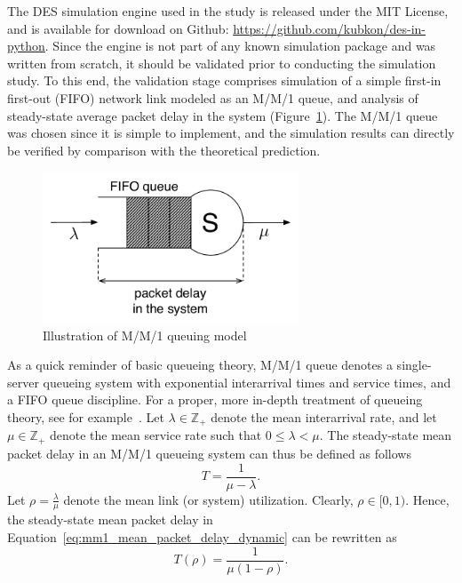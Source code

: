 The DES simulation engine used in the study is released under the MIT License, and is available for download on Github: \url{https://github.com/kubkon/des-in-python}. Since the engine is not part of any known simulation package and was written from scratch, it should be validated prior to conducting the simulation study. To this end, the validation stage comprises simulation of a simple first-in first-out (FIFO) network link modeled as an M/M/1 queue, and analysis of steady-state average packet delay in the system (Figure~\ref{fig:mm1_queue_dynamic}). The M/M/1 queue was chosen since it is simple to implement, and the simulation results can directly be verified by comparison with the theoretical prediction.

\begin{figure}[h]
	\includegraphics[width=3in]{3/Figures/mm1_queue}
	\caption{Illustration of M/M/1 queuing model}
	\label{fig:mm1_queue_dynamic}
\end{figure}

As a quick reminder of basic queueing theory, M/M/1 queue denotes a single-server queueing system with exponential interarrival times and service times, and a FIFO queue discipline. For a proper, more in-depth treatment of queueing theory, see for example~\cite{CassandrasLafortune2008}. Let $\lambda\in\mathbb{Z}_+$ denote the mean interarrival rate, and let $\mu\in\mathbb{Z}_+$ denote the mean service rate such that $0 \le \lambda < \mu$. The steady-state mean packet delay in an M/M/1 queueing system can thus be defined as follows
\begin{equation}
	\label{eq:mm1_mean_packet_delay_dynamic}
	T = \frac{1}{\mu - \lambda}.
\end{equation}
Let $\rho = \displaystyle\frac{\lambda}{\mu}$ denote the mean link (or system) utilization. Clearly, $\rho\in [0,1)$. Hence, the steady-state mean packet delay in Equation~\eqref{eq:mm1_mean_packet_delay_dynamic} can be rewritten as
\begin{equation}
	\label{eq:mm1_mean_packet_delay_2_dynamic}
	T(\rho) = \frac{1}{\mu(1 - \rho)}.
\end{equation}

